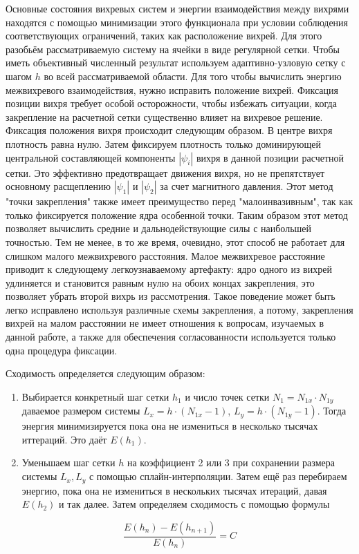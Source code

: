 Основные состояния вихревых систем и энергии взаимодействия между вихрями 
находятся с помощью минимизации этого функционала при условии соблюдения 
соответствующих ограничений, таких как расположение вихрей. Для этого разобьём 
рассматриваемую систему на ячейки в виде регулярной сетки. Чтобы иметь 
объективный численный результат используем адаптивно-узловую сетку с шагом 
\( h \) во всей рассматриваемой области. Для того чтобы вычислить энергию 
межвихревого взаимодействия, нужно исправить положение вихрей. Фиксация 
позиции вихря требует особой осторожности, чтобы избежать ситуации, когда 
закрепление на расчетной сетки существенно влияет на вихревое решение. 
Фиксация положения вихря происходит следующим образом. В центре вихря 
плотность равна нулю. Затем фиксируем плотность только доминирующей 
центральной составляющей компоненты \( |\psi_i| \) вихря в данной позиции 
расчетной сетки. Это эффективно предотвращает движения вихря, но не 
препятствует основному расщеплению \( |\psi_1| \) и \( |\psi_2| \) за счет 
магнитного давления. Этот метод "точки закрепления" также имеет преимущество 
перед "малоинвазивным", так как только фиксируется положение ядра особенной 
точки. Таким образом этот метод позволяет вычислить средние и 
дальнодействующие силы с наибольшей точностью. Тем не менее, в то же время, 
очевидно, этот способ не работает для слишком малого межвихревого расстояния. 
Малое межвихревое расстояние приводит к следующему легкоузнаваемому артефакту: 
ядро одного из вихрей удлиняется и становится равным нулю на обоих концах 
закрепления, это позволяет убрать второй вихрь из рассмотрения. Такое 
поведение может быть легко исправлено используя различные схемы закрепления, а 
потому, закрепления вихрей на малом расстоянии не имеет отношения к вопросам, 
изучаемых в данной работе, а также для обеспечения согласованности 
используется только одна процедура фиксации.

Сходимость определяется следующим образом:
\begin{enumerate}
    \item Выбирается конкретный шаг сетки \( h_1 \) и число точек сетки 
        \( N_1 = N_{1x} \cdot N_{1y} \) даваемое размером системы
        \( L_x = h \cdot (N_{1x}-1) \), \( L_y = h \cdot (N_{1y}-1) \). 
        Тогда энергия минимизируется пока она не измениться в несколько
        тысячах иттераций. Это даёт \( E(h_1) \).
    \item Уменьшаем шаг сетки \( h \) на коэффициент 2 или 3 при сохранении 
        размера системы \( L_x, L_y \) с помощью сплайн-интерполяции. 
        Затем ещё раз перебираем энергию, пока она не измениться в 
        нескольких тысячах итераций, давая \( E(h_2) \) и так далее. 
        Затем определяем сходимость с помощью формулы
\end{enumerate}
\begin{equation}
    \frac{E(h_n) - E(h_{n+1})}{E(h_n)} = C
\end{equation}

